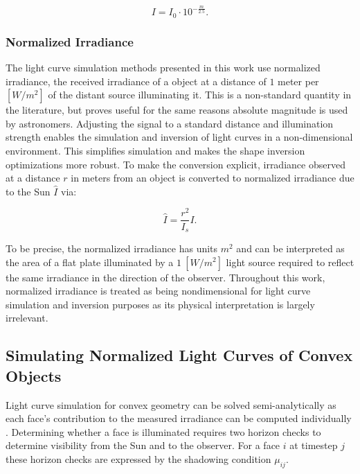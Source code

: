 \begin{equation} \label{eq:mag_to_irradiance}
  I = I_0 \cdot 10^{-\frac{m}{2.5}}.
\end{equation}

\subsubsection{Normalized Irradiance}

The light curve simulation methods presented in this work use normalized irradiance, the received irradiance of a object at a distance of $1$ meter per $\left[ W/m^2 \right]$ of the distant source illuminating it. This is a non-standard quantity in the literature, but proves useful for the same reasons absolute magnitude is used by astronomers. Adjusting the signal to a standard distance and illumination strength enables the simulation and inversion of light curves in a non-dimensional environment. This simplifies simulation and makes the shape inversion optimizations more robust. To make the conversion explicit, irradiance observed at a distance $r$ in meters from an object is converted to normalized irradiance due to the Sun $\hat{I}$ via:

\begin{equation} \label{eq:irradiance_to_norm_irradiance}
  \hat{I} = \frac{r^2}{I_s} I.
\end{equation}

To be precise, the normalized irradiance has units $m^2$ and can be interpreted as the area of a flat plate illuminated by a $1 \: \left[W/m^2\right]$ light source required to reflect the same irradiance in the direction of the observer. Throughout this work, normalized irradiance is treated as being nondimensional for light curve simulation and inversion purposes as its physical interpretation is largely irrelevant.

\subsection{Simulating Normalized Light Curves of Convex Objects}

Light curve simulation for convex geometry can be solved semi-analytically as each face's contribution 
to the measured irradiance can be computed individually \cite{kaasalainen2001}. 
Determining whether a face is illuminated requires two horizon checks to determine visibility 
from the Sun and to the observer. For a face $i$ at timestep $j$ these horizon checks are 
expressed by the shadowing condition $\mu_{ij}$. 

